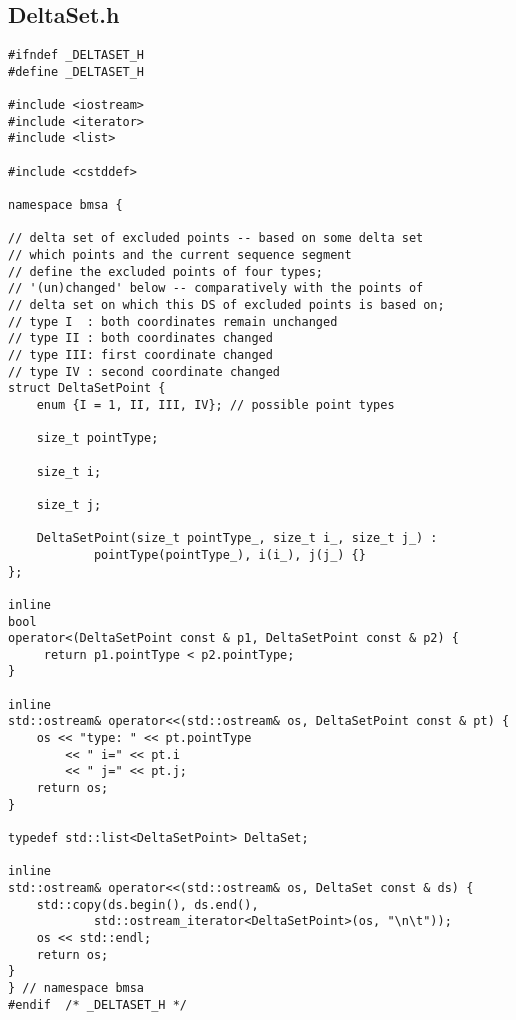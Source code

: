 \subsection*{DeltaSet.h}
\begin{lstlisting}
#ifndef _DELTASET_H
#define	_DELTASET_H

#include <iostream>
#include <iterator>
#include <list>

#include <cstddef>

namespace bmsa {

// delta set of excluded points -- based on some delta set 
// which points and the current sequence segment 
// define the excluded points of four types;
// '(un)changed' below -- comparatively with the points of
// delta set on which this DS of excluded points is based on;
// type I  : both coordinates remain unchanged
// type II : both coordinates changed
// type III: first coordinate changed
// type IV : second coordinate changed
struct DeltaSetPoint {
    enum {I = 1, II, III, IV}; // possible point types

    size_t pointType;

    size_t i;

    size_t j;

    DeltaSetPoint(size_t pointType_, size_t i_, size_t j_) :
            pointType(pointType_), i(i_), j(j_) {}
};

inline
bool
operator<(DeltaSetPoint const & p1, DeltaSetPoint const & p2) {
     return p1.pointType < p2.pointType;
}

inline
std::ostream& operator<<(std::ostream& os, DeltaSetPoint const & pt) {
    os << "type: " << pt.pointType
        << " i=" << pt.i
        << " j=" << pt.j;
    return os;
}

typedef std::list<DeltaSetPoint> DeltaSet;

inline
std::ostream& operator<<(std::ostream& os, DeltaSet const & ds) {
    std::copy(ds.begin(), ds.end(),
            std::ostream_iterator<DeltaSetPoint>(os, "\n\t"));
    os << std::endl;
    return os;
}
} // namespace bmsa
#endif	/* _DELTASET_H */
\end{lstlisting}

